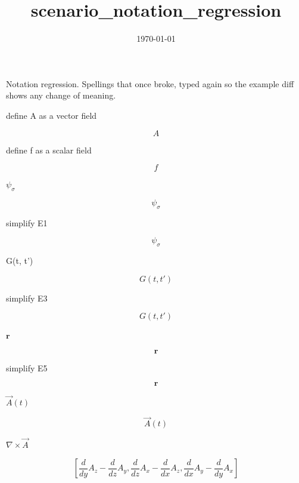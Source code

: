 \documentclass[dvipdfmx]{article}
\title{scenario\_notation\_regression}
\date{\today}
\begin{document}
\maketitle

Notation regression. Spellings that once broke, typed again so the example diff shows any change of meaning.

define A as a vector field

\[
  A
\]

define f as a scalar field

\[
  f
\]

$\psi_\sigma$

\begin{equation}
  \psi_\sigma
  \label{eq:E1}
\end{equation}

simplify E1

\begin{equation}
  \psi_{\sigma}
  \label{eq:E2}
\end{equation}

G(t, t')

\begin{equation}
  G(t, t')
  \label{eq:E3}
\end{equation}

simplify E3

\begin{equation}
  G\left(t , t'\right)
  \label{eq:E4}
\end{equation}

$\mathbf r$

\begin{equation}
  \mathbf r
  \label{eq:E5}
\end{equation}

simplify E5

\begin{equation}
  \mathbf{r}
  \label{eq:E6}
\end{equation}

$\vec{A}(t)$

\begin{equation}
  \vec{A}(t)
  \label{eq:E7}
\end{equation}

$\nabla \times \vec{A}$

\begin{equation}
  \left[ \frac{d}{d y} A_{z}-\frac{d}{d z} A_{y} , \frac{d}{d z} A_{x}-\frac{d}{d x} A_{z} , \frac{d}{d x} A_{y}-\frac{d}{d y} A_{x} \right]
  \label{eq:E8}
\end{equation}
\end{document}

